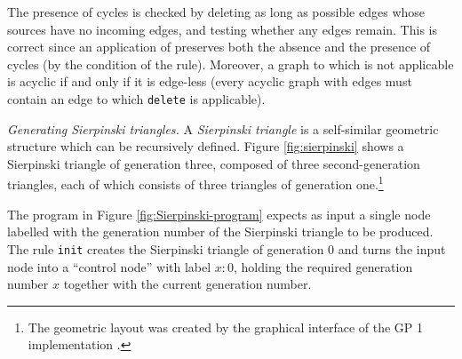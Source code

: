 The presence of cycles is checked by deleting as long as possible edges whose sources have no incoming edges, and testing whether any edges remain. This is correct since an application of  preserves both the absence and the presence of cycles (by the condition of the rule). Moreover, a graph to which  is not applicable is acyclic if and only if it is edge-less (every acyclic graph with edges must contain an edge to which \texttt{delete} is applicable). 

% 
% 
% 


\vspace{.5\baselineskip}
\noindent
\emph{Generating Sierpinski triangles.} A \emph{Sierpinski triangle} is a self-similar geometric structure which can be recursively defined. Figure \ref{fig:sierpinski} shows a Sierpinski triangle of generation three, composed of three second-generation triangles, each of which consists of three triangles of generation one.\footnote{The geometric layout was created by the graphical interface of the GP 1 implementation \cite{Manning-Plump08b}.}

The program in Figure \ref{fig:Sierpinski-program} expects as input a single node labelled with the generation number of the Sierpinski triangle to be produced. The rule \texttt{init} creates the Sierpinski triangle of generation 0 and turns the input node into a ``control node'' with label $x{:}0$, holding the required generation number $x$ together with the current generation number.

